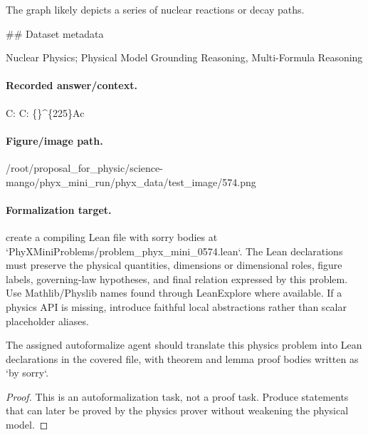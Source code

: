 The graph likely depicts a series of nuclear reactions or decay paths.

\#\# Dataset metadata

Nuclear Physics; Physical Model Grounding Reasoning, Multi-Formula Reasoning

\paragraph{Recorded answer/context.}
C: C: \{\}\textasciicircum{}\{225\}Ac

\paragraph{Figure/image path.}
/root/proposal\_for\_physic/science-mango/phyx\_mini\_run/phyx\_data/test\_image/574.png

\paragraph{Formalization target.}
create a compiling Lean file with sorry bodies at `PhyXMiniProblems/problem\_phyx\_mini\_0574.lean`. The Lean declarations must preserve the physical quantities, dimensions or dimensional roles, figure labels, governing-law hypotheses, and final relation expressed by this problem.
Use Mathlib/Physlib names found through LeanExplore where available. If a physics API is missing, introduce faithful local abstractions rather than scalar placeholder aliases.

\begin{theorem}
\label{thm:physics:phyx_mini_0574:target}
The assigned autoformalize agent should translate this physics problem into Lean declarations in the covered file, with theorem and lemma proof bodies written as `by sorry`.
\end{theorem}
\begin{proof}
This is an autoformalization task, not a proof task. Produce statements that can later be proved by the physics prover without weakening the physical model.
\end{proof}

